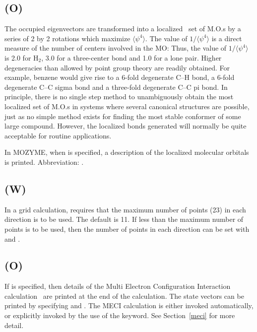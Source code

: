\subsection*{ (O)}
The occupied eigenvectors are transformed into a  localized~\cite{local}  set  of
M.O.s by a series of 2 by 2 rotations which maximize $\langle\psi^4\rangle$.  The
value of $1/\langle\psi^4\rangle$ is a direct measure of the number of centers involved
in  the MO: Thus, the value of $1/\langle\psi^4\rangle$ is 2.0 for H$_2$, 3.0 for a
three-center bond and 1.0 for a  lone  pair.   Higher  degeneracies  than
allowed by point group theory are readily obtained.  For example, benzene
would give rise to a 6-fold degenerate C--H bond, a 6-fold degenerate  C--C
sigma  bond and a three-fold degenerate C--C pi bond.  In principle, there
is no single step method to unambiguously obtain the most  localized  set
of  M.O.s  in  systems  where several canonical structures are possible,
just as no simple method exists for finding the most stable conformer  of
some  large  compound.   However,  the  localized  bonds  generated  will
   normally be quite acceptable  for  routine  applications.

In MOZYME, when  is specified, a description of the localized
molecular orbitals is printed.
Abbreviation:
   .





\subsection*{ (W)}
  In a grid  calculation,  requires that the  maximum  number
of  points  (23)  in  each
  direction  is  to  be  used.  The default is 11.  If less than the
maximum number of points is to be used, then the number of points in
  each direction can be set with  and .


\subsection*{ (O)}
 If  is specified, then details of the   Multi  Electron
   Configuration  Interaction  calculation~\cite{meci} are printed
at the end of the calculation.
   The state vectors
  can  be  printed  by  specifying   and .   The  MECI
   calculation is either invoked automatically, or explicitly invoked by the
   use of the  keyword.  See Section~\ref{meci} for more detail.
